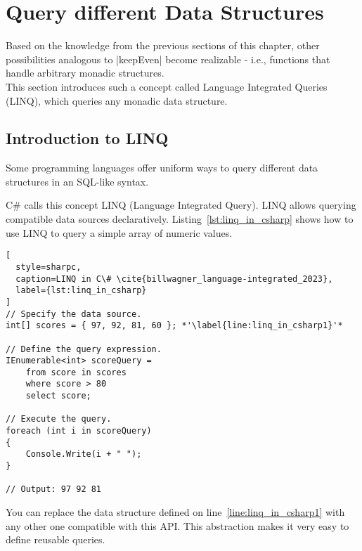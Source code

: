 \section{Query different Data Structures}
\label{sec:Query different Data Structures}
Based on the knowledge from the previous sections of this chapter, other
possibilities analogous to |keepEven| become realizable - i.e., functions that
handle arbitrary monadic structures. \\ 
This section introduces such a concept called Language Integrated Queries
(LINQ), which queries any monadic data structure. 

\subsection{Introduction to LINQ} %
\label{sub:Introduction to LINQ}
Some programming languages offer uniform ways to query different data
structures in an SQL-like syntax.

C\# calls this concept LINQ (Language Integrated Query).
LINQ allows querying compatible data sources declaratively. 
Listing~\ref{lst:linq_in_csharp} shows how to use LINQ to query a simple array 
of numeric values.

\begin{lstlisting}[
  style=sharpc,
  caption=LINQ in C\# \cite{billwagner_language-integrated_2023},
  label={lst:linq_in_csharp}
]
// Specify the data source.
int[] scores = { 97, 92, 81, 60 }; *'\label{line:linq_in_csharp1}'*

// Define the query expression.
IEnumerable<int> scoreQuery =
    from score in scores
    where score > 80
    select score;

// Execute the query.
foreach (int i in scoreQuery)
{
    Console.Write(i + " ");
}

// Output: 97 92 81
\end{lstlisting}

You can replace the data structure defined on line~\ref{line:linq_in_csharp1}
with any other one compatible with this API. This abstraction makes it very
easy to define reusable queries.


